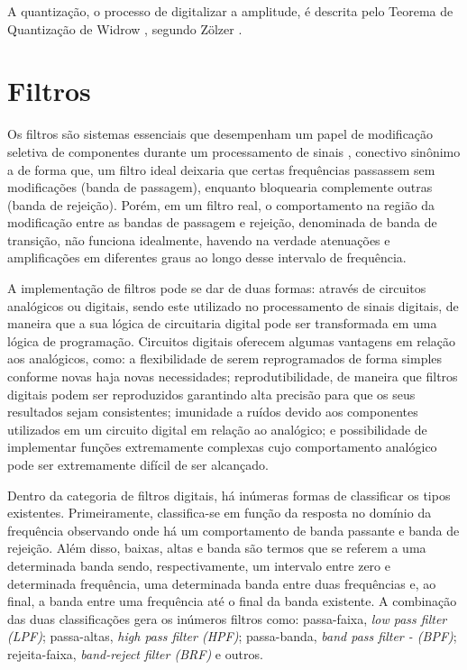 A quantização, o processo de digitalizar a amplitude, é descrita pelo Teorema de Quantização de Widrow \cite{widrow}, segundo Zölzer \cite{zolzer2008digital}.

\section{Filtros}


Os filtros são sistemas essenciais que desempenham um papel de modificação seletiva de componentes durante um processamento de sinais \cite{oppenheim2013processamento}, conectivo sinônimo a de forma que, um filtro ideal deixaria que certas frequências passassem sem modificações (banda de passagem), enquanto bloquearia complemente outras (banda de rejeição). Porém, em um filtro real, o comportamento na região da modificação entre as bandas de passagem e rejeição, denominada de banda de transição, não funciona idealmente, havendo na verdade atenuações e amplificações em diferentes graus ao longo desse intervalo de frequência.

A implementação de filtros pode se dar de duas formas: através de circuitos analógicos ou digitais, sendo este utilizado no processamento de sinais digitais, de maneira que a sua lógica de circuitaria digital pode ser transformada em uma lógica de programação. Circuitos digitais oferecem algumas vantagens em relação aos analógicos, como: a flexibilidade de serem reprogramados de forma simples conforme novas haja novas necessidades; reprodutibilidade, de maneira que filtros digitais podem ser reproduzidos garantindo alta precisão para que os seus resultados sejam consistentes; imunidade a ruídos devido aos componentes utilizados em um circuito digital em relação ao analógico; e possibilidade de implementar funções extremamente complexas cujo comportamento analógico pode ser extremamente difícil de ser alcançado.

Dentro da categoria de filtros digitais, há inúmeras formas de classificar os tipos existentes. Primeiramente, classifica-se em função da resposta no domínio da frequência observando onde há um comportamento de banda passante e banda de rejeição. Além disso, baixas, altas e banda são termos que se referem a uma determinada banda sendo, respectivamente, um intervalo entre zero e determinada frequência, uma determinada banda entre duas frequências e, ao final, a banda entre uma frequência até o final da banda existente. A combinação das duas classificações gera os inúmeros filtros como: passa-faixa, \textit{low pass filter (LPF)}; passa-altas, \textit{high pass filter (HPF)}; passa-banda, \textit{band pass filter - (BPF)}; rejeita-faixa, \textit{band-reject filter (BRF)} e outros. 

